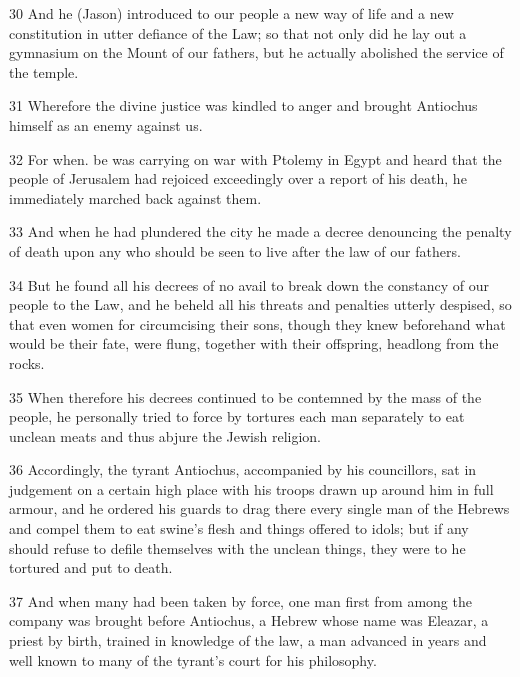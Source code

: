 \par 30 And he (Jason) introduced to our people a new way of life and a new constitution in utter defiance of the Law; so that not only did he lay out a gymnasium on the Mount of our fathers, but he actually abolished the service of the temple.

\par 31 Wherefore the divine justice was kindled to anger and brought Antiochus himself as an enemy against us.

\par 32 For when. be was carrying on war with Ptolemy in Egypt and heard that the people of Jerusalem had rejoiced exceedingly over a report of his death, he immediately marched back against them.

\par 33 And when he had plundered the city he made a decree denouncing the penalty of death upon any who should be seen to live after the law of our fathers.

\par 34 But he found all his decrees of no avail to break down the constancy of our people to the Law, and he beheld all his threats and penalties utterly despised, so that even women for circumcising their sons, though they knew beforehand what would be their fate, were flung, together with their offspring, headlong from the rocks.

\par 35 When therefore his decrees continued to be contemned by the mass of the people, he personally tried to force by tortures each man separately to eat unclean meats and thus abjure the Jewish religion.

\par 36 Accordingly, the tyrant Antiochus, accompanied by his councillors, sat in judgement on a certain high place with his troops drawn up around him in full armour, and he ordered his guards to drag there every single man of the Hebrews and compel them to eat swine's flesh and things offered to idols; but if any should refuse to defile themselves with the unclean things, they were to he tortured and put to death.

\par 37 And when many had been taken by force, one man first from among the company was brought before Antiochus, a Hebrew whose name was Eleazar, a priest by birth, trained in knowledge of the law, a man advanced in years and well known to many of the tyrant's court for his philosophy.


